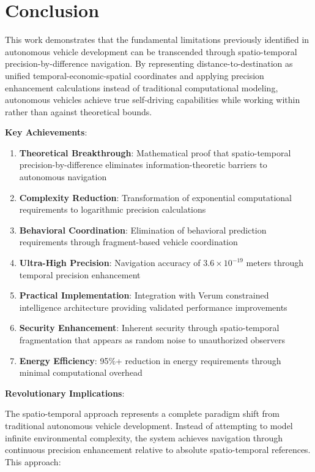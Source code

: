 \documentclass[12pt,a4paper]{article}
\begin{document}
\section{Conclusion}

This work demonstrates that the fundamental limitations previously identified in autonomous vehicle development can be transcended through spatio-temporal precision-by-difference navigation. By representing distance-to-destination as unified temporal-economic-spatial coordinates and applying precision enhancement calculations instead of traditional computational modeling, autonomous vehicles achieve true self-driving capabilities while working within rather than against theoretical bounds.

\textbf{Key Achievements}:

\begin{enumerate}
\item \textbf{Theoretical Breakthrough}: Mathematical proof that spatio-temporal precision-by-difference eliminates information-theoretic barriers to autonomous navigation

\item \textbf{Complexity Reduction}: Transformation of exponential computational requirements to logarithmic precision calculations

\item \textbf{Behavioral Coordination}: Elimination of behavioral prediction requirements through fragment-based vehicle coordination

\item \textbf{Ultra-High Precision}: Navigation accuracy of $3.6 \times 10^{-19}$ meters through temporal precision enhancement

\item \textbf{Practical Implementation}: Integration with Verum constrained intelligence architecture providing validated performance improvements

\item \textbf{Security Enhancement}: Inherent security through spatio-temporal fragmentation that appears as random noise to unauthorized observers

\item \textbf{Energy Efficiency}: 95\%+ reduction in energy requirements through minimal computational overhead
\end{enumerate}

\textbf{Revolutionary Implications}:

The spatio-temporal approach represents a complete paradigm shift from traditional autonomous vehicle development. Instead of attempting to model infinite environmental complexity, the system achieves navigation through continuous precision enhancement relative to absolute spatio-temporal references. This approach:
\end{document}
